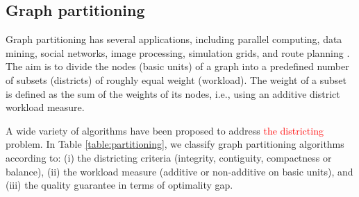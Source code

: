 \documentclass[preprint,11pt]{elsarticle}
\begin{document}
\subsection{Graph partitioning} \label{sec:2.1}
Graph partitioning has several applications, including parallel computing, data mining, social networks, image processing, simulation grids, and route planning \citep{Catalyurek2023,Cordero2025}. 
The aim is to divide the nodes (basic units) of a graph into a predefined number of subsets (districts) of roughly equal weight (workload).
The weight of a subset is defined as the sum of the weights of its nodes, i.e., using an additive district workload measure.

A wide variety of algorithms have been proposed to address \textcolor{red}{the districting} problem. 
In Table \ref{table:partitioning}, we classify graph partitioning algorithms according to: (i) the districting criteria (integrity, contiguity, compactness or balance), (ii) the workload measure (additive or non-additive on basic units), and (iii) the quality guarantee in terms of optimality gap.
\end{document}
